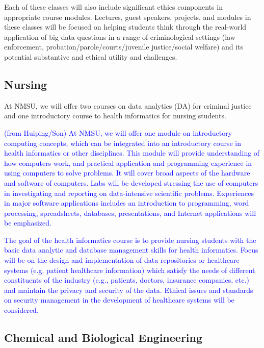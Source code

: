 Each of these classes will also include significant ethics components in appropriate course modules. Lectures, guest speakers, projects, and modules in these classes will be focused on helping students think through the real-world application of big data questions in a range of criminological settings (law enforcement, probation/parole/courts/juvenile justice/social welfare) and its potential substantive and ethical utility and challenges.

\subsection{Nursing}
\label{sec:research:nursing}
At NMSU, we will offer two courses on data analytics (DA) for criminal justice and one introductory course to health informatics for nursing students. 

\textcolor{blue}{(from Huiping/Son)  At NMSU, we will offer one module on introductory computing concepts, which can be integrated into an introductory course in health informatics or other disciplines.  
This module will provide understanding of how computers work, and practical application and programming experience in using computers to solve problems. It will cover broad aspects of the hardware and software of computers. Labs will be developed stressing the use of computers in investigating and reporting on data-intensive scientific problems. Experiences in  major software applications includes an introduction to programming, word processing, spreadsheets, databases, presentations, and Internet applications will be emphasized. 
}


\textcolor{blue}{The goal of the health informatics course is to provide nursing students with the basic data analytic and database management skills for health informatics. Focus will be on the design and implementation of data repositories or healthcare systems (e.g. patient healthcare information) which satisfy the needs of different constituents of the industry (e.g., patients, doctors, insurance companies, etc.) and maintain the privacy and security of the data. Ethical issues and standards on security management in the development of healthcare systems will be considered. }

\subsection{Chemical and Biological Engineering}

